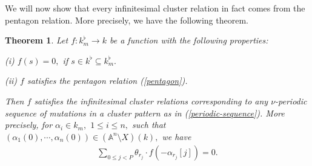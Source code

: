 \documentclass{amsart}
\newtheorem{theorem}{Theorem}[subsection]
\theoremstyle{definition}
\numberwithin{equation}{subsection}
\begin{document}
We will now show that every infinitesimal cluster relation  in fact comes from the pentagon relation. More precisely, we have the following theorem. 

\begin{theorem}\label{inf-red-theorem}
Let $f:k_{m} ^{\flat} \to k$  be a function with the following properties:

(i) $f(s)=0,$ if $s \in k^{\flat} \subseteq k_{m} ^{\flat}.$

(ii) $f$ satisfies the pentagon relation (\ref{pentagon}).

\noindent Then $f$ satisfies the infinitesimal cluster relations corresponding to any $\nu$-periodic sequence of mutations in a cluster pattern as in (\ref{periodic-sequence}). More precisely, for $\alpha_{i} \in k_{m},$ $1\leq i \leq n,$ such that $(\alpha_{1}(0), \cdots, \alpha _{n} (0)) \in (\mathbb{A}^n \setminus X)(k),$ we have 
 \begin{align}\label{general-formula}
 \sum _{0\leq j <P} \theta_{r_j}\cdot f(-\alpha_{r_j}[j])=0.
 \end{align}
\end{theorem}
\end{document}
